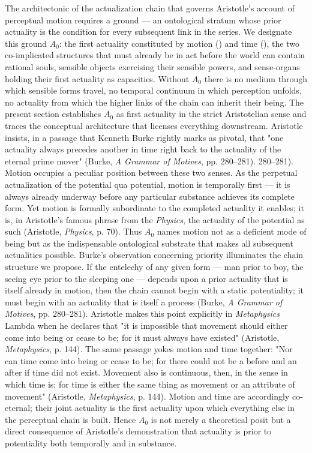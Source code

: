 The architectonic of the actualization chain that governs Aristotle's account of perceptual motion requires a ground --- an ontological stratum whose prior actuality is the condition for every subsequent link in the series. We designate this ground $A_0$: the first actuality constituted by motion () and time (), the two co-implicated structures that must already be in act before the world can contain rational souls, sensible objects exercising their sensible powers, and sense-organs holding their first actuality as capacities. Without $A_0$ there is no medium through which sensible forms travel, no temporal continuum in which perception unfolds, no actuality from which the higher links of the chain can inherit their being. The present section establishes $A_0$ as first actuality in the strict Aristotelian sense and traces the conceptual architecture that licenses everything downstream. Aristotle insists, in a passage that Kenneth Burke rightly marks as pivotal, that "one actuality always precedes another in time right back to the actuality of the eternal prime mover" (Burke, \textit{A Grammar of Motives}, pp. 280--281). 280--281). Motion occupies a peculiar position between these two senses. As the perpetual actualization of the potential qua potential, motion is temporally first --- it is always already underway before any particular substance achieves its complete form. Yet motion is formally subordinate to the completed actuality it enables; it is, in Aristotle's famous phrase from the \textit{Physics}, the actuality of the potential as such (Aristotle, \textit{Physics}, p. 70). Thus $A_0$ names motion not as a deficient mode of being but as the indispensable ontological substrate that makes all subsequent actualities possible. Burke's observation concerning priority illuminates the chain structure we propose. If the entelechy of any given form --- man prior to boy, the seeing eye prior to the sleeping one --- depends upon a prior actuality that is itself already in motion, then the chain cannot begin with a static potentiality; it must begin with an actuality that is itself a process (Burke, \textit{A Grammar of Motives}, pp. 280--281). Aristotle makes this point explicitly in \textit{Metaphysics} Lambda when he declares that "it is impossible that movement should either come into being or cease to be; for it must always have existed" (Aristotle, \textit{Metaphysics}, p. 144). The same passage yokes motion and time together: "Nor can time come into being or cease to be; for there could not be a before and an after if time did not exist. Movement also is continuous, then, in the sense in which time is; for time is either the same thing as movement or an attribute of movement" (Aristotle, \textit{Metaphysics}, p. 144). Motion and time are accordingly co-eternal; their joint actuality is the first actuality upon which everything else in the perceptual chain is built. Hence $A_0$ is not merely a theoretical posit but a direct consequence of Aristotle's demonstration that actuality is prior to potentiality both temporally and in substance. 

